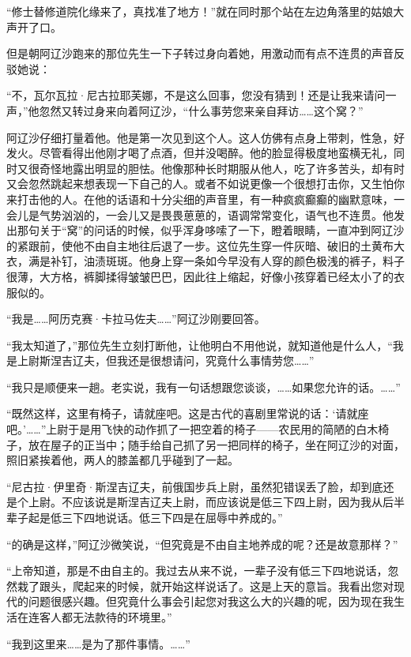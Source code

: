 \par “修士替修道院化缘来了，真找准了地方！”就在同时那个站在左边角落里的姑娘大声开了口。
\par 但是朝阿辽沙跑来的那位先生一下子转过身向着她，用激动而有点不连贯的声音反驳她说：
\par “不，瓦尔瓦拉·尼古拉耶芙娜，不是这么回事，您没有猜到！还是让我来请问一声，”他忽然又转过身来向着阿辽沙，“什么事劳您来亲自拜访……这个窝？”
\par 阿辽沙仔细打量着他。他是第一次见到这个人。这人仿佛有点身上带刺，性急，好发火。尽管看得出他刚才喝了点酒，但并没喝醉。他的脸显得极度地蛮横无礼，同时又很奇怪地露出明显的胆怯。他像那种长时期服从他人，吃了许多苦头，却有时又会忽然跳起来想表现一下自己的人。或者不如说更像一个很想打击你，又生怕你来打击他的人。在他的话语和十分尖细的声音里，有一种疯疯癫癫的幽默意味，一会儿是气势汹汹的，一会儿又是畏畏葸葸的，语调常常变化，语气也不连贯。他发出那句关于“窝”的问话的时候，似乎浑身哆嗦了一下，瞪着眼睛，一直冲到阿辽沙的紧跟前，使他不由自主地往后退了一步。这位先生穿一件灰暗、破旧的土黄布大衣，满是补钉，油渍斑斑。他身上穿一条如今早没有人穿的颜色极浅的裤子，料子很薄，大方格，裤脚揉得皱皱巴巴，因此往上缩起，好像小孩穿着已经太小了的衣服似的。
\par “我是……阿历克赛·卡拉马佐夫……”阿辽沙刚要回答。
\par “我太知道了，”那位先生立刻打断他，让他明白不用他说，就知道他是什么人，“我是上尉斯涅吉辽夫，但我还是很想请问，究竟什么事情劳您……”
\par “我只是顺便来一趟。老实说，我有一句话想跟您谈谈，……如果您允许的话。……”
\par “既然这样，这里有椅子，请就座吧。这是古代的喜剧里常说的话：‘请就座吧。’……”上尉于是用飞快的动作抓了一把空着的椅子——农民用的简陋的白木椅子，放在屋子的正当中；随手给自己抓了另一把同样的椅子，坐在阿辽沙的对面，照旧紧挨着他，两人的膝盖都几乎碰到了一起。
\par “尼古拉·伊里奇·斯涅吉辽夫，前俄国步兵上尉，虽然犯错误丢了脸，却到底还是个上尉。不应该说是斯涅吉辽夫上尉，而应该说是低三下四上尉，因为我从后半辈子起是低三下四地说话。低三下四是在屈辱中养成的。”
\par “的确是这样，”阿辽沙微笑说，“但究竟是不由自主地养成的呢？还是故意那样？”
\par “上帝知道，那是不由自主的。我过去从来不说，一辈子没有低三下四地说话，忽然栽了跟头，爬起来的时候，就开始这样说话了。这是上天的意旨。我看出您对现代的问题很感兴趣。但究竟什么事会引起您对我这么大的兴趣的呢，因为现在我生活在连客人都无法款待的环境里。”
\par “我到这里来……是为了那件事情。……”
